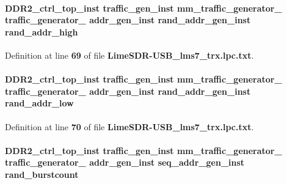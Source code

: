 \paragraph[{rand\+\_\+addr\+\_\+high}]{ {\bf D\+D\+R2\+\_\+ctrl\+\_\+top\+\_\+inst} {\bf traffic\+\_\+gen\+\_\+inst} {\bf mm\+\_\+traffic\+\_\+generator\+\_} {\bf traffic\+\_\+generator\+\_} {\bf addr\+\_\+gen\+\_\+inst} {\bf rand\+\_\+addr\+\_\+gen\+\_\+inst} rand\+\_\+addr\+\_\+high}\label{LimeSDR-USB__lms7__trx_8lpc_8txt_ad6f8779fee38d065ad7c3b9f1db9f5a8}


Definition at line {\bf 69} of file {\bf Lime\+S\+D\+R-\/\+U\+S\+B\+\_\+lms7\+\_\+trx.\+lpc.\+txt}.

\paragraph[{rand\+\_\+addr\+\_\+low}]{ {\bf D\+D\+R2\+\_\+ctrl\+\_\+top\+\_\+inst} {\bf traffic\+\_\+gen\+\_\+inst} {\bf mm\+\_\+traffic\+\_\+generator\+\_} {\bf traffic\+\_\+generator\+\_} {\bf addr\+\_\+gen\+\_\+inst} {\bf rand\+\_\+addr\+\_\+gen\+\_\+inst} rand\+\_\+addr\+\_\+low}\label{LimeSDR-USB__lms7__trx_8lpc_8txt_a44354d09796c1eaa525410fbc5b89d3d}


Definition at line {\bf 70} of file {\bf Lime\+S\+D\+R-\/\+U\+S\+B\+\_\+lms7\+\_\+trx.\+lpc.\+txt}.

\paragraph[{rand\+\_\+burstcount}]{ {\bf D\+D\+R2\+\_\+ctrl\+\_\+top\+\_\+inst} {\bf traffic\+\_\+gen\+\_\+inst} {\bf mm\+\_\+traffic\+\_\+generator\+\_} {\bf traffic\+\_\+generator\+\_} {\bf addr\+\_\+gen\+\_\+inst} {\bf seq\+\_\+addr\+\_\+gen\+\_\+inst} rand\+\_\+burstcount}\label{LimeSDR-USB__lms7__trx_8lpc_8txt_a44b940330082df89803973ec95fd3fc6}


